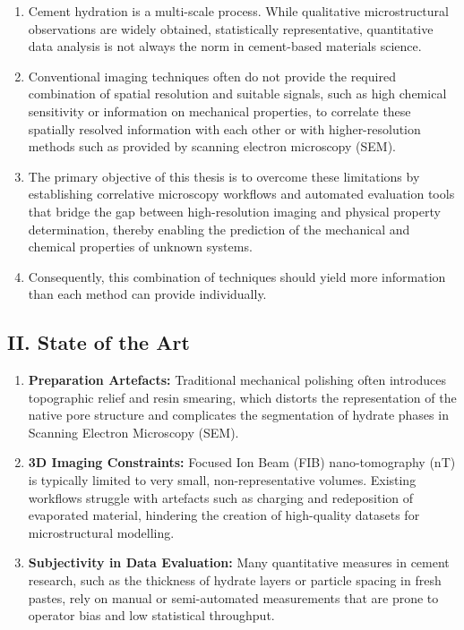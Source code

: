 \documentclass[11pt, a4paper]{article}
\begin{document}
\begin{enumerate}[label=\textbf{\arabic*.}, leftmargin=1.5cm, labelsep=0.5cm, itemsep=0.5em]
    \item Cement hydration is a multi-scale process.
    While qualitative microstructural observations are widely obtained, statistically representative, quantitative data analysis is not always the norm in cement-based materials science.
    \item Conventional imaging techniques often do not provide the required combination of spatial resolution and suitable signals, such as high chemical sensitivity or information on mechanical properties, to correlate these spatially resolved information with each other or with higher-resolution methods such as provided by scanning electron microscopy (SEM).
    \item The primary objective of this thesis is to overcome these limitations by establishing correlative microscopy workflows and automated evaluation tools that bridge the gap between high-resolution imaging and physical property determination, thereby enabling the prediction of the mechanical and chemical properties of unknown systems.
    \item Consequently, this combination of techniques should yield more information than each method can provide individually.
\end{enumerate}

\subsection*{II. State of the Art}

\begin{enumerate}[label=\textbf{\arabic*.}, leftmargin=1.5cm, labelsep=0.5cm, itemsep=0.5em, resume]
    \item \textbf{Preparation Artefacts:} Traditional mechanical polishing often introduces topographic relief and resin smearing, which distorts the representation of the native pore structure and complicates the segmentation of hydrate phases in Scanning Electron Microscopy (SEM).
    \item \textbf{3D Imaging Constraints:} Focused Ion Beam (FIB) nano-tomography (nT) is typically limited to very small, non-representative volumes.
    Existing workflows struggle with artefacts such as charging and redeposition of evaporated material, hindering the creation of high-quality datasets for microstructural modelling.
    \item \textbf{Subjectivity in Data Evaluation:} Many quantitative measures in cement research, such as the thickness of hydrate layers or particle spacing in fresh pastes, rely on manual or semi-automated measurements that are prone to operator bias and low statistical throughput.
\end{enumerate}
\end{document}
